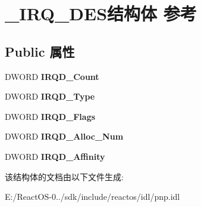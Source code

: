 \hypertarget{struct___i_r_q___d_e_s}{}\section{\+\_\+\+I\+R\+Q\+\_\+\+D\+E\+S结构体 参考}
\label{struct___i_r_q___d_e_s}
\subsection*{Public 属性}
\begin{DoxyCompactItemize}
\item 
\mbox{\label{struct___i_r_q___d_e_s_a6e74012c6c1d544ebb1181d454de7377}} 
D\+W\+O\+RD {\bfseries I\+R\+Q\+D\+\_\+\+Count}
\item 
\mbox{\label{struct___i_r_q___d_e_s_a1ebb78b781d4d340887cd657bfa52c02}} 
D\+W\+O\+RD {\bfseries I\+R\+Q\+D\+\_\+\+Type}
\item 
\mbox{\label{struct___i_r_q___d_e_s_aed55091b2fc38cab30395a50c10dfe21}} 
D\+W\+O\+RD {\bfseries I\+R\+Q\+D\+\_\+\+Flags}
\item 
\mbox{\label{struct___i_r_q___d_e_s_a94ce7311213918d53d7fbcd8b512c6b6}} 
D\+W\+O\+RD {\bfseries I\+R\+Q\+D\+\_\+\+Alloc\+\_\+\+Num}
\item 
\mbox{\label{struct___i_r_q___d_e_s_a14f90aaab2fca327f26ff8725903fb97}} 
D\+W\+O\+RD {\bfseries I\+R\+Q\+D\+\_\+\+Affinity}
\end{DoxyCompactItemize}


该结构体的文档由以下文件生成\+:\begin{DoxyCompactItemize}
\item 
E\+:/\+React\+O\+S-\/0../sdk/include/reactos/idl/pnp.\+idl\end{DoxyCompactItemize}
